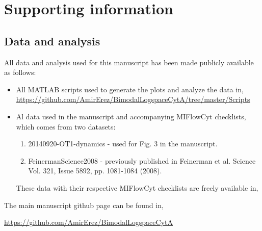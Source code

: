 \documentclass[11pt,a4paper,draft]{article}
\begin{document}
%




\newpage
\section*{Supporting information}
%

\subsection*{Data and analysis}
All data and analysis used for this manuscript has been made publicly available as follows:

\smallskip
\begin{itemize}
\item All MATLAB scripts used to generate the plots and analyze the data in,
\\
{\small \href{https://github.com/AmirErez/BimodalLogspaceCytA/tree/master/Scripts}{https://github.com/AmirErez/BimodalLogspaceCytA/tree/master/Scripts}}
\item Al data used in the manuscript and accompanying MIFlowCyt checklists, which comes from two datasets:
	\begin{enumerate}
	\item 20140920-OT1-dynamics - used for Fig. 3 in the manuscript.
	\item FeinermanScience2008 - previously published in Feinerman et al. Science Vol. 321, Issue 5892, pp. 1081-1084 (2008). 
	\end{enumerate}
These data with their respective MIFlowCyt checklists are freely available in,

\smallskip
{}

\end{itemize} 

\smallskip
The main manuscript github page can be found in,

\smallskip
\href{https://github.com/AmirErez/BimodalLogspaceCytA}{https://github.com/AmirErez/BimodalLogspaceCytA}
\end{document}
